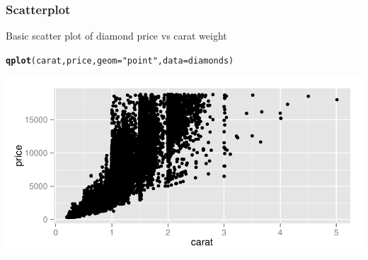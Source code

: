 \documentclass{beamer}\usepackage[]{graphicx}\usepackage[]{color}
\makeatletter
\newcommand{\hlstr}[1]{\textcolor[rgb]{0.192,0.494,0.8}{#1}}%
\newcommand{\hlstd}[1]{\textcolor[rgb]{0.345,0.345,0.345}{#1}}%
\newcommand{\hlkwc}[1]{\textcolor[rgb]{0.333,0.667,0.333}{#1}}%
\newcommand{\hlkwd}[1]{\textcolor[rgb]{0.737,0.353,0.396}{\textbf{#1}}}%
\newenvironment{kframe}{%
 \def\at@end@of@kframe{}%
 \ifinner\ifhmode%
  \def\at@end@of@kframe{\end{minipage}}%
  \begin{minipage}{\columnwidth}%
 \fi\fi%
 \def\FrameCommand##1{\hskip\@totalleftmargin \hskip-\fboxsep
 \colorbox{shadecolor}{##1}\hskip-\fboxsep
     \hskip-\linewidth \hskip-\@totalleftmargin \hskip\columnwidth}%
 \MakeFramed {\advance\hsize-\width
   \@totalleftmargin\z@ \linewidth\hsize
   \@setminipage}}%
 {\par\unskip\endMakeFramed%
 \at@end@of@kframe}
\newenvironment{knitrout}{}{} %
\makeatother
\begin{document}
\begin{frame}[fragile]
\frametitle{Scatterplot}
    
    Basic scatter plot of diamond price vs carat weight
    
\footnotesize
\begin{knitrout}\footnotesize
{}\color{fgcolor}\begin{kframe}
\begin{alltt}
\hlkwd{qplot}\hlstd{(carat, price,} \hlkwc{geom}\hlstd{=}\hlstr{"point"}\hlstd{,} \hlkwc{data}\hlstd{=diamonds)}
\end{alltt}
\end{kframe}

{\centering \includegraphics[width=.9\linewidth]{figure/kdiamondscatter1} 

}



\end{knitrout}
\normalsize
\end{frame}

\end{document}
